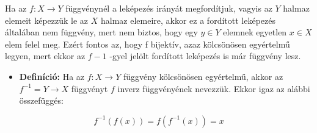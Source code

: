 \documentclass[12pt,a4paper]{article}
\begin{document}
\begin{tcolorbox}[colback=green!5!white,colframe=green!60!black,title= 4. Inverz függvény]
Ha az \(f:X \to Y\) függvénynél a leképezés irányát megfordítjuk, vagyis az \(Y\) halmaz elemeit
képezzük le az \(X\) halmaz elemeire, akkor ez a fordított leképezés általában nem függvény, mert nem biztos, hogy egy \(y \in Y\) elemnek egyetlen \(x \in X\) elem felel meg. Ezért fontos az, hogy f bijektív, azaz kölcsönösen egyértelmű legyen, mert ekkor az \(f-1\) -gyel jelölt fordított leképezés is már függvény lesz.    
    \begin{itemize}
        \item \textbf{Definíció:} Ha az \(f: X \to Y\) függvény kölcsönösen egyértelmű, akkor az \(f^{-1} = Y \to X\)
        függvényt \(f\) inverz függvényének nevezzük. Ekkor igaz az alábbi összefüggés:
    \end{itemize}
    $$f^{-1}(f(x)) = f(f^{-1}(x)) = x$$
\end{tcolorbox}
\end{document}
